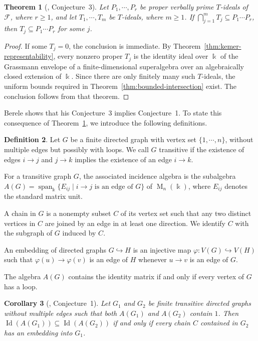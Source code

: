 \documentclass[11pt,reqno]{amsart}
\newcommand{\kk}{\Bbbk}
\newcommand{\F}{\mathcal F}
\newcommand{\Id}{\operatorname{Id}}
\newcommand{\Mat}{\operatorname{M}}
\newtheorem{theorem}{Theorem}[section]
\newtheorem{corollary}[theorem]{Corollary}
\theoremstyle{definition}
\newtheorem{definition}[theorem]{Definition}
\theoremstyle{remark}
\numberwithin{equation}{section}
\begin{document}
\begin{theorem}[\cite{Berele2012}, Conjecture~3]
\label{thm:finite-intersection}
Let $P_1,\cdots,P_r$ be proper verbally prime
$T$-ideals of $\F$, where $r\geq1$, and let
$T_1,\cdots,T_m$ be $T$-ideals, where $m\geq1$.
If $\bigcap_{j=1}^m T_j\subseteq P_1\cdots P_r$, then $T_j\subseteq P_1\cdots P_r $ for some $j$.
\end{theorem}

\begin{proof}
If some $T_j=0$, the conclusion is immediate.
By Theorem~\ref{thm:kemer-representability}, every nonzero
proper $T_j$ is the identity ideal over $\kk$ of the
Grassmann envelope of a finite-dimensional superalgebra
over an algebraically closed extension of $\kk$.
Since there are only finitely many such $T$-ideals,
the uniform bounds required in
Theorem~\ref{thm:bounded-intersection} exist.
The conclusion follows from that theorem.
\end{proof}

Berele \cite[Corollary~2.4]{Berele2012} shows that his
Conjecture~3 implies Conjecture~1. To state this consequence of
Theorem~\ref{thm:finite-intersection}, we  introduce 
the following definitions.

\begin{definition}\label{def:incidence-graph}
Let $G$ be a finite directed graph with vertex set
$\{1,\cdots,n\}$, without multiple edges but possibly
with loops. We call $G$ transitive if the existence of
edges $i\to j$ and $j\to k$ implies the existence of
an edge $i\to k$.

For a transitive graph $G$, the associated incidence
algebra is the subalgebra 
$
A(G)=\operatorname{span}_{\kk}
\{E_{ij}\mid i\to j\text{ is an edge of }G\}$ of $ \Mat_n(\kk)$,
where $E_{ij}$ denotes the standard matrix unit.

A chain in $G$ is a nonempty subset $C$ of its vertex
set such that any two distinct vertices in $C$ are
joined by an edge in at least one direction.
We identify $C$ with the subgraph of $G$ induced by $C$.

An embedding of directed graphs $G\hookrightarrow H$
is an injective map $\varphi:V(G)\hookrightarrow V(H)$ such that
$\varphi(u)\to\varphi(v)$ is an edge of $H$ whenever
$u\to v$ is an edge of $G$.
\end{definition}

The algebra $A(G)$ contains the identity matrix if
and only if every vertex of $G$ has a loop.


\begin{corollary}[\cite{Berele2012}, Conjecture~1]
\label{cor:berele-one}
Let $G_1$ and $G_2$ be finite transitive directed
graphs without multiple edges such that both
$A(G_1)$ and $A(G_2)$ contain $1$.
Then
$\Id(A(G_1))\subseteq\Id(A(G_2))$
if and only if every chain $C$ contained in $G_2$
has an embedding into $G_1$.
\end{corollary}
\end{document}
